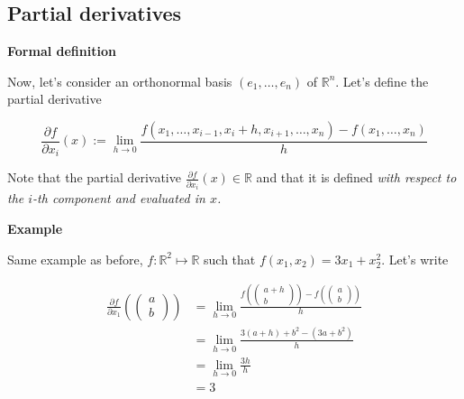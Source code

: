 \documentclass{tufte-handout}
\begin{document}
\subsection{Partial derivatives}
\textbf{Formal definition}

Now, let's consider an orthonormal basis $ (e_1, \ldots, e_n ) $ of $ \mathbb{R}^n $. Let's define the partial derivative

$$ \frac{\partial f}{\partial x_i}(x) := \lim\limits_{h \rightarrow 0} \frac{f(x_1, \ldots, x_{i-1}, x_i + h, x_{i+1}, \ldots, x_n) - f(x_1,\ldots, x_n)}{h}
$$

Note that the partial derivative $ \frac{\partial f}{\partial x_i}(x) \in \mathbb{R} $ and that it is defined \emph{with respect to the $i$-th component and evaluated in $ x $.}

\textbf{Example}

Same example as before, $ f : \mathbb{R}^2 \mapsto \mathbb{R} $ such that $ f(x_1,x_2) = 3x_1 + x_2^2 $. Let's write 

\begin{align*}
\frac{\partial f}{\partial x_1}(\begin{pmatrix}
a\\b
\end{pmatrix}) &= \lim\limits_{h \rightarrow 0} \frac{f(\begin{pmatrix}
a + h\\b
\end{pmatrix}) - f(\begin{pmatrix}
a \\b
\end{pmatrix})}{h}\\
&= \lim\limits_{h \rightarrow 0} \frac{3(a+h) + b^2 - (3a + b^2)}{h}\\
&= \lim\limits_{h \rightarrow 0} \frac{3h}{h}\\
&= 3
\end{align*}
\end{document}
